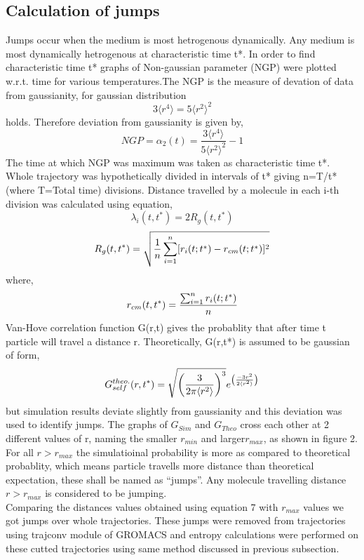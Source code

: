 \documentclass{article}[a4paper,12pt,twoside]
\begin{document}
\subsection{Calculation of jumps}
Jumps occur when the medium is most hetrogenous dynamically. Any medium is most dynamically hetrogenous at characteristic time t*. In order to find characteristic time t* 
graphs of Non-gaussian parameter (NGP) were plotted w.r.t. time for various temperatures.The NGP is the measure of devation of data from gaussianity, for gaussian distribution 
\begin{equation}
	3\langle r^4 \rangle=5\langle r^2 \rangle^2
\end{equation}
holds. Therefore deviation from gaussianity is given by,
\begin{equation}
	NGP=\alpha_2(t)=\frac{3\langle r^4 \rangle}{5\langle r^2 \rangle^2} - 1
\end{equation}
The time at which NGP was maximum was taken as characteristic time t*. Whole trajectory was hypothetically
divided in intervals of t* giving n=T/t* (where T=Total time) divisions. Distance travelled by a molecule in each i-th division was calculated using equation,
\begin{equation}
	\lambda_i(t,t^*)=2R_g(t,t^*)
\end{equation}
\begin{equation}
	R_g(t,t^*)=\scriptsize{\sqrt{\frac{1}{n}\sum_{i=1}^{n} [r_i(t;t^*)-r_{cm}(t;t^*)]^2}}
\end{equation}
where, \begin{equation}
	\scriptsize{r_{cm}(t,t^*)=\frac{\sum_{i=1}^{n}r_i(t;t^*)}{n}}
\end{equation}
Van-Hove correlation function G(r,t) gives the probablity that after time t particle will travel a distance r. Theoretically, G(r,t*) is assumed to be gaussian of form,
\begin{equation}
      	\scriptsize{G_{self}^{theo.}(r,t^*)=\sqrt{\left( \frac{3}{2\pi\langle r^2 \rangle}  \right)^3}e^{\left(\frac{-3r^2}{2\langle r^2 \rangle}\right)}}
\end{equation}
but simulation results deviate slightly from gaussianity and this deviation was used to identify jumps. The graphs of $G_{Sim}$ and $G_{Theo}$ cross each other at 2 different
values of r, naming the smaller $r_{min}$ and larger$r_{max}$, as shown in figure 2. For all $r > r_{max}$ the simulatioinal probability is more as compared to theoretical 
probablity, which means particle travells more distance than theoretical expectation, these shall be named as ``jumps''. Any molecule travelling distance $r > r_{max}$ is
considered to be jumping.\\ Comparing the distances values obtained using equation 7 with $r_{max}$ values we got jumps over whole trajectories. These jumps were removed from 
trajectories using trajconv module of GROMACS and entropy calculations were performed on these cutted trajectories using same method discussed in previous subsection.
\end{document}
